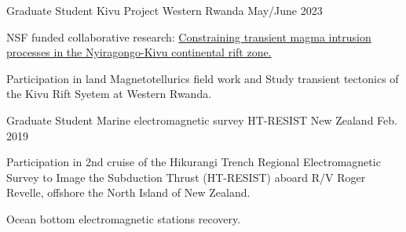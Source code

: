 

\begin{cventries}

  \cventry
    {Graduate Student} %
    {Kivu Project} %
    {Western Rwanda} %
    {May/June 2023} %
    {
      \begin{cvitems} %
        \item {NSF funded collaborative research: \href{https://avnewman.github.io/KIVU/}{Constraining transient magma intrusion processes in the Nyiragongo-Kivu continental rift zone.}}
        \item {Participation in land Magnetotellurics field work and Study transient tectonics of the Kivu Rift Syetem at Western Rwanda.}
      \end{cvitems}
    }

  \cventry
    {Graduate Student} %
    {Marine electromagnetic survey HT-RESIST} %
    {New Zealand} %
    {Feb. 2019} %
    {
      \begin{cvitems} %
        \item {Participation in 2nd cruise of the Hikurangi Trench Regional Electromagnetic Survey to Image the Subduction Thrust (HT-RESIST) aboard R/V Roger Revelle, offshore the North Island of New Zealand.}
        \item {Ocean bottom electromagnetic stations recovery.}
      \end{cvitems}
    }

\end{cventries}
